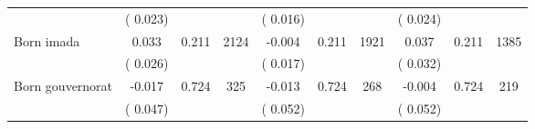 \begin{tabular}{l*{9}{c}}
                               &        (       0.023) & &                                                                 &       (       0.016) & &                                                          &       (       0.024) & &                                          \\ 
 Born imada                        &              0.033                &        0.211 & 2124                &             -0.004 &        0.211 & 1921                       &        0.037 &        0.211 & 1385                             \\ 
                               &        (       0.026) & &                                                                        &       (       0.017) & &                                                         &       (       0.032) & &                                         \\ 
 Born gouvernorat                        &             -0.017                &        0.724 & 325                &             -0.013 &        0.724 & 268                       &       -0.004 &        0.724 & 219                             \\ 
                               &        (       0.047) & &                                                                        &       (       0.052) & &                                                         &       (       0.052) & &                                         \\ 
\hline \end{tabular}                                                                                                                                                      